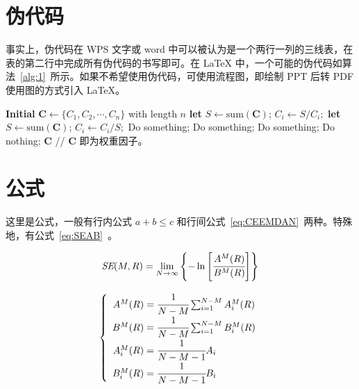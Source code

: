 \documentclass[14pt]{jnuthesis}
\begin{document}
\section{伪代码}

事实上，伪代码在 WPS 文字或 word 中可以被认为是一个两行一列的三线表，在表的第二行中完成所有伪代码的书写即可。在 LaTeX 中，一个可能的伪代码如算法~\ref{alg:1}~所示。如果不希望使用伪代码，可使用流程图，即绘制 PPT 后转 PDF 使用图的方式引入 LaTeX。

\begin{algorithm}[H]
	\caption{自动调整不均匀数据集权值。}
	\begin{algorithmic}[1]
		\State \textbf{Initial } $\bm{C} \gets \{C_1, C_2, \cdots, C_n\}$ with length $n$
		\State \textbf{let } $S \gets \mathrm{sum}(\bm{C})$;
			\State $C_i \gets S / C_i;$
		\EndFor
		\State \textbf{let } $S \gets \mathrm{sum}(\bm{C})$;
			\State $C_i \gets C_i / S;$
		\EndFor
			\State Do something;
			\State Do something;
			\State Do something;
		\Else
			\State Do nothing;
		\EndIf
		\State \Return $\bm{C}$ // $\bm{C}$ 即为权重因子。 
	\end{algorithmic}
	\label{alg:1}
\end{algorithm}

\section{公式}

这里是公式，一般有行内公式 $a + b \leqslant c$ 和行间公式~\eqref{eq:CEEMDAN}~两种。特殊地，有公式~\eqref{eq:SEAB}~。

\begin{equation}
	\textit{SE}(M, R) = \mathop{\lim}_{N \to \infty}\left\{-\ln\left[\cfrac{A^M(R)}{B^M(R)}\right]\right\}
	\label{eq:SE}
\end{equation}

\begin{equation}
	\begin{aligned}
		\left\{\begin{array}{r@{{}={}}l}
			A^M(R) & \cfrac{1}{N - M}\mathop{\sum}_{i = 1}^{N - M}A_i^M(R)  \\
			B^M(R) & \cfrac{1}{N - M}\mathop{\sum}_{i = 1}^{N - M}B_i^M(R)  \\
			A_i^M(R) & \cfrac{1}{N - M - 1}A_i  \\
			B_i^M(R) & \cfrac{1}{N - M - 1}B_i
		\end{array}
		\right.
	\end{aligned}
	\label{eq:SEAB}
\end{equation}
\end{document}
